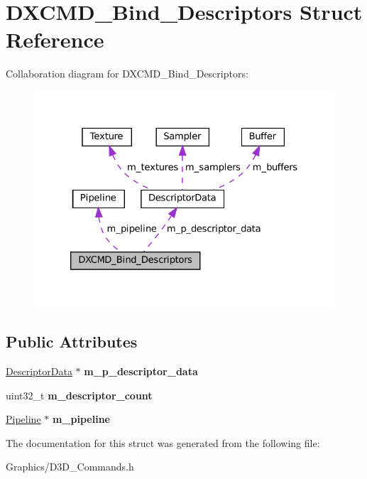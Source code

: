 \hypertarget{structDXCMD__Bind__Descriptors}{}\section{D\+X\+C\+M\+D\+\_\+\+Bind\+\_\+\+Descriptors Struct Reference}
\label{structDXCMD__Bind__Descriptors}


Collaboration diagram for D\+X\+C\+M\+D\+\_\+\+Bind\+\_\+\+Descriptors\+:\nopagebreak
\begin{figure}[H]
\begin{center}
\leavevmode
\includegraphics[width=326pt]{structDXCMD__Bind__Descriptors__coll__graph}
\end{center}
\end{figure}
\subsection*{Public Attributes}
\begin{DoxyCompactItemize}
\item 
\mbox{\label{structDXCMD__Bind__Descriptors_ab808f8e26d8c2495c59224a2c158bc00}} 
\hyperlink{structDescriptorData}{Descriptor\+Data} $\ast$ {\bfseries m\+\_\+p\+\_\+descriptor\+\_\+data}
\item 
\mbox{\label{structDXCMD__Bind__Descriptors_a407211335edb3c34376799061a184a33}} 
uint32\+\_\+t {\bfseries m\+\_\+descriptor\+\_\+count}
\item 
\mbox{\label{structDXCMD__Bind__Descriptors_aea942ffd2e4c6e0d1cfaa8c782f9e092}} 
\hyperlink{classPipeline}{Pipeline} $\ast$ {\bfseries m\+\_\+pipeline}
\end{DoxyCompactItemize}


The documentation for this struct was generated from the following file\+:\begin{DoxyCompactItemize}
\item 
Graphics/D3\+D\+\_\+\+Commands.\+h\end{DoxyCompactItemize}

